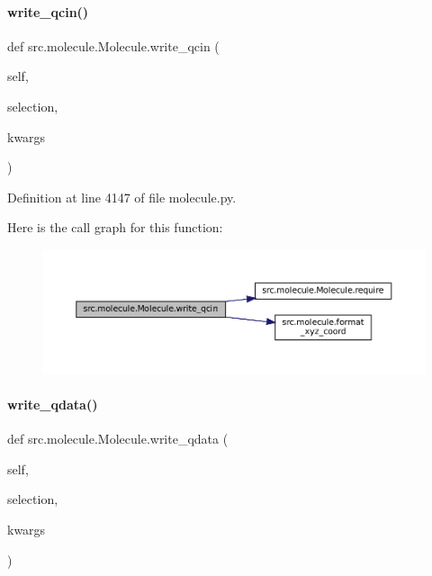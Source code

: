 \paragraph{\texorpdfstring{write\+\_\+qcin()}{write\_qcin()}}
{\footnotesize\ttfamily def src.\+molecule.\+Molecule.\+write\+\_\+qcin (\begin{DoxyParamCaption}\item[{}]{self,  }\item[{}]{selection,  }\item[{}]{kwargs }\end{DoxyParamCaption})}



Definition at line 4147 of file molecule.\+py.

Here is the call graph for this function\+:
\nopagebreak
\begin{figure}[H]
\begin{center}
\leavevmode
\includegraphics[width=350pt]{classsrc_1_1molecule_1_1Molecule_a21d78053aab2fda1fd5e2577a02ec696_cgraph}
\end{center}
\end{figure}
\mbox{\label{classsrc_1_1molecule_1_1Molecule_ac33547444f6fc81cae37ce37db9743ef}} 
\paragraph{\texorpdfstring{write\+\_\+qdata()}{write\_qdata()}}
{\footnotesize\ttfamily def src.\+molecule.\+Molecule.\+write\+\_\+qdata (\begin{DoxyParamCaption}\item[{}]{self,  }\item[{}]{selection,  }\item[{}]{kwargs }\end{DoxyParamCaption})}



